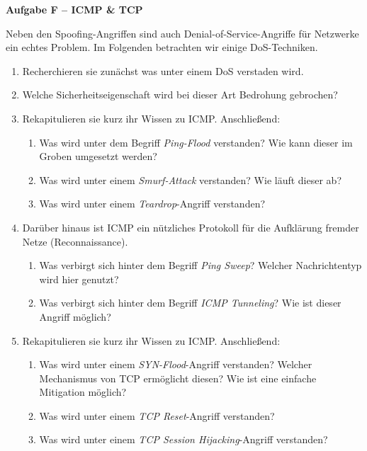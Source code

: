 \documentclass[paper=a4,fontsize=11pt]{scrartcl}%
\numberwithin{equation}{section}
\begin{document}
\begin{center}\Large{\textbf{Aufgabe F -- ICMP \& TCP}}\end{center}\vskip0.25in
Neben den Spoofing-Angriffen sind auch Denial-of-Service-Angriffe für Netzwerke ein echtes Problem. Im Folgenden betrachten wir einige DoS-Techniken.
\begin{enumerate}
	\item Recherchieren sie zunächst was unter einem DoS verstaden wird.
	\item Welche Sicherheitseigenschaft wird bei dieser Art Bedrohung gebrochen?
	\item Rekapitulieren sie kurz ihr Wissen zu ICMP. Anschließend:
	\begin{enumerate}
		\item Was wird unter dem Begriff \emph{Ping-Flood} verstanden? Wie kann dieser im Groben umgesetzt werden?
		\item Was wird unter einem \emph{Smurf-Attack} verstanden? Wie läuft dieser ab?
		\item Was wird unter einem \emph{Teardrop}-Angriff verstanden?
	\end{enumerate}
	\item Darüber hinaus ist ICMP ein nützliches Protokoll für die Aufklärung fremder Netze (Reconnaissance).
	\begin{enumerate}
		\item Was verbirgt sich hinter dem Begriff \emph{Ping Sweep}? Welcher Nachrichtentyp wird hier genutzt?
		\item Was verbirgt sich hinter dem Begriff \emph{ICMP Tunneling}? Wie ist dieser Angriff möglich?
	\end{enumerate}
	\item Rekapitulieren sie kurz ihr Wissen zu ICMP. Anschließend:
	\begin{enumerate}
		\item Was wird unter einem \emph{SYN-Flood}-Angriff verstanden? Welcher Mechanismus von TCP ermöglicht diesen? Wie ist eine einfache Mitigation möglich?
		\item Was wird unter einem \emph{TCP Reset}-Angriff verstanden?
		\item Was wird unter einem \emph{TCP Session Hijacking}-Angriff verstanden?
	\end{enumerate}
\end{enumerate}


\printbibliography
\end{document}
